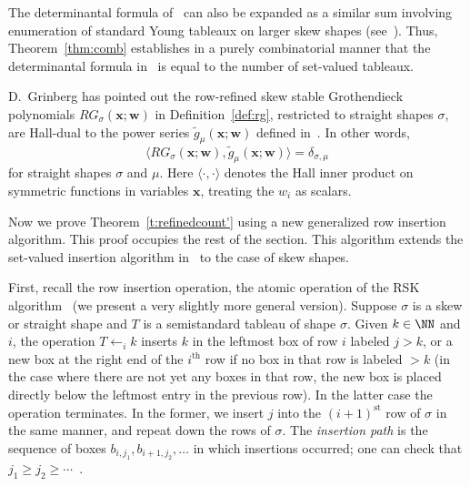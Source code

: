 \begin{rema}\label{rem:connection-to-act}
The determinantal formula of~\cite{anderson-chen-tarasca-k-classes} can also be expanded as a similar sum involving enumeration of standard Young tableaux on larger skew shapes (see~\cite[Theorem~C]{anderson-chen-tarasca-k-classes}).
Thus, Theorem~\ref{thm:comb} establishes in a purely combinatorial manner that the determinantal formula in~\cite{anderson-chen-tarasca-k-classes} is equal to the number of set-valued tableaux.
\end{rema}

\begin{rema}\label{rem:darij}
D.~Grinberg has pointed out the row-refined skew stable Grothendieck polynomials $RG_\sigma(\mathbf{x};\mathbf{w})$ in Definition~\ref{def:rg}, restricted to straight shapes $\sigma$, are Hall-dual to the power series $\tilde{g}_{\mu}(\mathbf{x};\mathbf{w})$ defined in~\cite{galashin-grinberg-liu-refined}. In other words, 
\[
\langle RG_\sigma(\mathbf{x};\mathbf{w}), \tilde{g}_\mu(\mathbf{x};\mathbf{w})\rangle = \delta_{\sigma,\mu}
\]
for straight shapes $\sigma$ and $\mu$. Here $\langle\cdot,\cdot\rangle$ denotes the Hall inner product on symmetric functions in variables $\mathbf{x}$, treating the $w_i$ as scalars. 
\end{rema}






Now we prove Theorem~\ref{t:refinedcount'} using a new generalized row insertion algorithm. This proof occupies the rest of the section. This algorithm extends the set-valued insertion algorithm in~\cite{bandlow-morse-combinatorial} to the case of skew shapes. 

\begin{defi}\label{def:rsk} First, recall the row insertion operation, the atomic operation of the RSK algorithm~\cite[\S~7.11]{ec2} (we present a very slightly more general version). Suppose $\sigma$ is a skew or straight shape and $T$ is a semistandard tableau of shape $\sigma$. Given $k\in \NN$ and $i$, the operation $T\leftarrow_i k$ inserts $k$ in the leftmost box of row $i$ labeled $j>k$, or a new box at the right end of the $i^\text{th}$ row if no box in that row is labeled $>k$ (in the case where there are not yet any boxes in that row, the new box is placed directly below the leftmost entry in the previous row). In the latter case the operation terminates. In the former, we insert $j$ into the $(i+1)^\text{st}$ row of $\sigma$ in the same manner, and repeat down the rows of $\sigma$. The \emph{insertion path} is the sequence of boxes $b_{i,j_1},b_{i+1,j_2},\ldots$ in which insertions occurred; one can check that $j_1 \ge j_2 \ge \cdots$~\cite[Lemma~7.11.2]{ec2}.
\end{defi}

